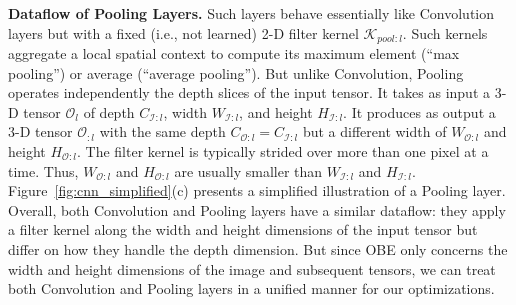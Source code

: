 
\vspace{2mm}
\noindent \textbf{Dataflow of Pooling Layers.} 
Such layers behave essentially like Convolution layers but with a fixed (i.e., not learned) 2-D filter kernel $\mathcal{K}_{pool:l}$. Such kernels aggregate a local spatial context to compute its maximum element (``max pooling'') or average (``average pooling''). But unlike Convolution, Pooling operates independently the depth slices of the input tensor.
It takes as input a 3-D tensor $\mathcal{O}_{l}$ of depth $C_{\mathcal{I}:l}$, width $W_{\mathcal{I}:l}$, and height $H_{\mathcal{I}:l}$. It produces as output a 3-D tensor $\mathcal{O}_{:l}$ with the same depth $C_{\mathcal{O}:l}=C_{\mathcal{I}:l}$ but a different width of $W_{\mathcal{O}:l}$ and height $H_{\mathcal{O}:l}$. The filter kernel is typically strided over more than one pixel at a time. Thus, $W_{\mathcal{O}:l}$ and $H_{\mathcal{O}:l}$ are usually smaller than $W_{\mathcal{I}:l}$ and $H_{\mathcal{I}:l}$. Figure~\ref{fig:cnn_simplified}(c) presents a simplified illustration of a Pooling layer.
Overall, both Convolution and Pooling layers have a similar dataflow: they apply a filter kernel along the width and height dimensions of the input tensor but differ on how they handle the depth dimension. But since OBE only concerns the width and height dimensions of the image and subsequent tensors, we can treat both Convolution and Pooling layers in a unified manner for our optimizations.




